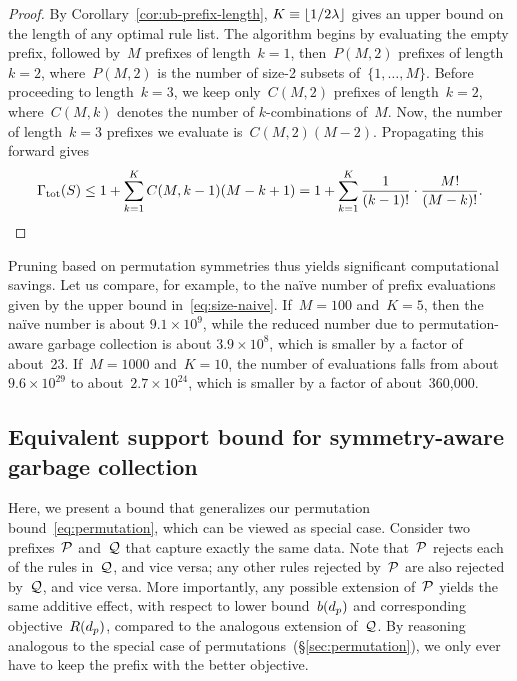 \begin{proof}
By Corollary~\ref{cor:ub-prefix-length},
${K \equiv \lfloor 1 / 2 {\lambda} \rfloor}$
gives an upper bound on the length of any optimal rule list.
%
The algorithm begins by evaluating the empty prefix,
followed by~$M$ prefixes of length~${k=1}$,
then~${P(M, 2)}$ prefixes of length~${k=2}$,
where~${P(M, 2)}$ is the number of size-2 subsets of~$\{1, \dots, M \}$.
%
Before proceeding to length~${k=3}$, we keep only~${C(M, 2)}$
prefixes of length~${k=2}$, where~${C(M, k)}$ denotes the
number of $k$-combinations of~$M$.
%
Now, the number of length~${k=3}$ prefixes we evaluate is~${C(M, 2) (M - 2)}$.
%
Propagating this forward gives
\begin{align}
\TotalRemaining(\RuleSet) \le 1 + \sum_{k=1}^K C(M, k-1) (M - k + 1)
= 1 + \sum_{k=1}^K \frac{1}{(k - 1)!} \cdot \frac{M!}{(M - k)!}.
\end{align}
\end{proof}

Pruning based on permutation symmetries thus yields significant
computational savings.
%
Let us compare, for example, to the na\"ive number of prefix evaluations
given by the upper bound in~\eqref{eq:size-naive}.
%
If~${M = 100}$ and~${K = 5}$, then the na\"ive number is about
${9.1 \times 10^9}$, while the reduced number due to permutation-aware
garbage collection is about ${3.9 \times 10^8}$,
which is smaller by a factor of about~23.
%
If~${M=1000}$ and~${K = 10}$, the number of evaluations falls from
about~${9.6 \times 10^{29}}$ to about~${2.7 \times 10^{24}}$,
which is smaller by a factor of about~360,000.
%

\subsection{Equivalent support bound for symmetry-aware garbage collection}

Here, we present a bound that generalizes our permutation bound~\eqref{eq:permutation},
which can be viewed as special case.
%
Consider two prefixes~$\cal P$ and~$\cal Q$ that capture exactly the same data.
%
Note that~$\cal P$ rejects each of the rules in~$\cal Q$, and vice versa;
any other rules rejected by~$\cal P$ are also rejected by~$\cal Q$, and vice versa.
%
More importantly, any possible extension of~$\cal P$ yields the same additive effect,
with respect to lower bound~$b(d_p)$ and corresponding objective~$R(d_p)$,
compared to the analogous extension of~$\cal Q$.
%
By reasoning analogous to the special case of permutations~(\S\ref{sec:permutation}),
we only ever have to keep the prefix with the better objective.

